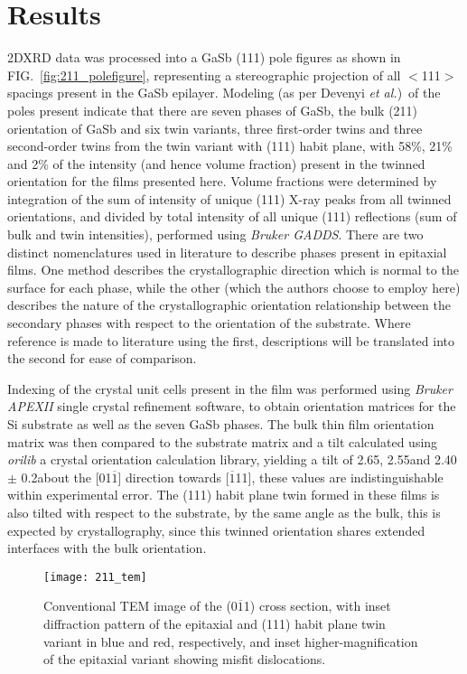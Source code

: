 \section{Results}
2DXRD data was processed into a GaSb (111) pole figures as shown in FIG.~\ref{fig:211_polefigure}, representing a stereographic projection of all $<$111$>$ spacings present in the GaSb epilayer. Modeling (as per Devenyi \textit{et al.}\cite{Devenyi2011})\ of the poles present indicate that there are seven phases of GaSb, the bulk (211) orientation of GaSb and six twin variants, three first-order twins and three second-order twins from the twin variant with (111) habit plane, with 58\%, 21\% and 2\% of the intensity (and hence volume fraction) present in the twinned orientation for the films presented here. Volume fractions were determined by integration of the sum of intensity of unique (111) X-ray peaks from all twinned orientations, and divided by total intensity of all unique (111) reflections (sum of bulk and twin intensities), performed using \textit{Bruker GADDS}. There are two distinct nomenclatures used in literature to describe phases present in epitaxial films.\cite{Kim2010a,Lange1991,Johnson2011,DeLyon1995} One method describes the crystallographic direction which is normal to the surface for each phase, while the other (which the authors choose to employ here) describes the nature of the crystallographic orientation relationship between the secondary phases with respect to the orientation of the substrate. Where reference is made to literature using the first, descriptions will be translated into the second for ease of comparison.

Indexing of the crystal unit cells present in the film was performed using \textit{Bruker APEXII} single crystal refinement software, to obtain orientation matrices for the Si substrate as well as the seven GaSb phases. The bulk thin film orientation matrix was then compared to the substrate matrix and a tilt calculated using \textit{orilib} a crystal orientation calculation library, yielding a tilt of 2.65\degree, 2.55\degree and 2.40\degree $\pm$ 0.2\degree about the [01$\overline{1}$] direction towards [$\overline{1}$11], these values are indistinguishable within experimental error. The (111) habit plane twin formed in these films is also tilted with respect to the substrate, by the same angle as the bulk, this is expected by crystallography, since this twinned orientation shares extended interfaces with the bulk orientation.
\begin{figure}
    \centering
\texttt{[image: 211\_tem]}
\caption{\label{fig:211_tem}Conventional TEM image of the (0$\overline{1}$1) cross section, with inset diffraction pattern of the epitaxial and (111) habit plane twin variant in blue and red, respectively, and inset higher-magnification of the epitaxial variant showing misfit dislocations.}
\end{figure}

